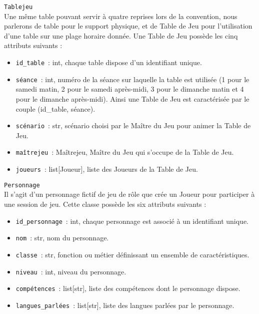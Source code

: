 \documentclass[11pt]{article}
\begin{document}
\texttt{Tablejeu}\\
Une même table pouvant servir à quatre reprises lors de la convention, nous parlerons de table pour le support physique, et de Table de Jeu pour l'utilisation d'une table sur une plage horaire donnée. Une Table de Jeu possède les cinq attributs suivants :
\begin{itemize}[label=, font=\small]
    \item \texttt{id\_table}~: int, chaque table dispose d'un  identifiant unique.
    \item \texttt{séance}~: int, numéro de la séance sur laquelle la table est utilisée (1 pour le samedi matin, 2 pour le samedi après-midi, 3 pour le dimanche matin et 4 pour le dimanche après-midi). Ainsi une Table de Jeu est caractérisée par le couple (id\_table, séance).
    \item \texttt{scénario}~: str, scénario choisi par le Maître du Jeu pour animer la Table de Jeu.
    \item \texttt{maîtrejeu}~: Maîtrejeu, Maître du Jeu qui s'occupe de la Table de Jeu.
    \item \texttt{joueurs}~: list[Joueur], liste des Joueurs de la Table de Jeu. 
\end{itemize}

\bigbreak

\texttt{Personnage}\\
Il s'agit d'un personnage fictif de jeu de rôle que crée un Joueur pour participer à une session de jeu. Cette classe possède les six attributs suivants :
\begin{itemize}[label=, font=\small]
    \item \texttt{id\_personnage}~: int, chaque personnage est associé à un identifiant unique.
    \item \texttt{nom}~: str, nom du personnage.
    \item \texttt{classe}~: str, fonction ou métier définissant un ensemble de caractéristiques.
    \item \texttt{niveau}~: int, niveau du personnage.
    \item \texttt{compétences}~: list[str], liste des compétences dont le personnage dispose.
    \item \texttt{langues\_parlées}~: list[str], liste des langues parlées par le personnage.
\end{itemize}

\bigbreak
\end{document}
